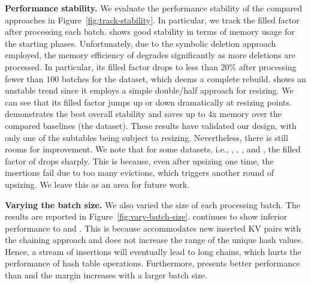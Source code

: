 \vspace{1mm}\noindent\textbf{Performance stability.}
We evaluate the performance stability of the compared approaches in Figure~\ref{fig:track-stability}. 
In particular, we track the filled factor after processing each batch.
\slab shows good stability in terms of memory usage for the starting phases. Unfortunately, due to the symbolic deletion approach employed, the memory efficiency of \slab degrades significantly as more deletions are processed. In particular, its filled factor drops to less than $20\%$ after processing fewer than 100 batches for the \dsali dataset, which deems a complete rebuild.
%
\megakv shows an unstable trend since it employs a simple double/half approach for resizing. We can see that its filled factor jumps up or down dramatically at resizing points. \voter demonstrates the best overall stability and saves up to 4x memory over the  compared baselines (the \dsali dataset). 
These results have validated our design, with only one of the subtables being subject to resizing. 
Nevertheless, there is still rooms for improvement. We note that for some datasets, i.e., \dstwitter, \dsreddit, \dstpch, and \dsrandom, the filled factor of \voter drops sharply.
This is because, even after upsizing one time, the insertions fail due to too many evictions, which triggers another round of upsizing. We leave this as an area for future work. 


\vspace{1mm}\noindent\textbf{Varying the batch size.}
We also varied the size of each processing batch. The results are reported in Figure~\ref{fig:vary-batch-size}. 
\slab continues to show inferior performance to \megakv and \voter. 
This is because \slab accommodates new inserted KV pairs with the chaining approach and does not increase the range of the unique hash values. Hence, a stream of insertions will eventually lead to long chains, which hurts the performance of hash table operations. Furthermore, \voter presents better performance than \megakv and the margin increases with a larger batch size.


